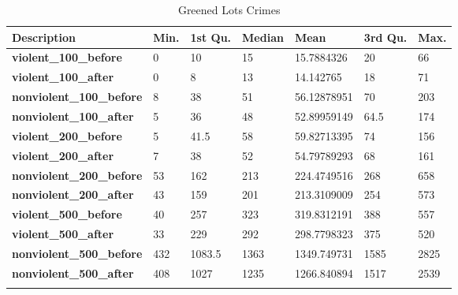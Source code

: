 \documentclass{article}
\begin{document}
\begin{table}[H]
\begin{center}
\caption{\label{tab:aa}Greened Lots Crimes}
\begin{tabular}{lllllll}
\hline
\textbf{Description}                        & \textbf{Min.} & \textbf{1st Qu.} & \textbf{Median} & \textbf{Mean} & \textbf{3rd Qu.} & \textbf{Max.} \\ \hline
\textbf{violent\_100\_before}    & 0             & 10               & 15              & 15.7884326    & 20               & 66            \\
\textbf{violent\_100\_after}     & 0             & 8                & 13              & 14.142765     & 18               & 71            \\
\textbf{nonviolent\_100\_before} & 8             & 38               & 51              & 56.12878951   & 70               & 203           \\
\textbf{nonviolent\_100\_after}  & 5             & 36               & 48              & 52.89959149   & 64.5             & 174           \\
\textbf{violent\_200\_before}    & 5             & 41.5             & 58              & 59.82713395   & 74               & 156           \\
\textbf{violent\_200\_after}     & 7             & 38               & 52              & 54.79789293   & 68               & 161           \\
\textbf{nonviolent\_200\_before} & 53            & 162              & 213             & 224.4749516   & 268              & 658           \\
\textbf{nonviolent\_200\_after}  & 43            & 159              & 201             & 213.3109009   & 254              & 573           \\
\textbf{violent\_500\_before}    & 40            & 257              & 323             & 319.8312191   & 388              & 557           \\
\textbf{violent\_500\_after}     & 33            & 229              & 292             & 298.7798323   & 375              & 520           \\
\textbf{nonviolent\_500\_before} & 432           & 1083.5           & 1363            & 1349.749731   & 1585             & 2825          \\
\textbf{nonviolent\_500\_after}  & 408           & 1027             & 1235            & 1266.840894   & 1517             & 2539          \\
                                 &               &                  &                 &               &                  &              
\end{tabular}
\end{center}
\end{table}
\end{document}
